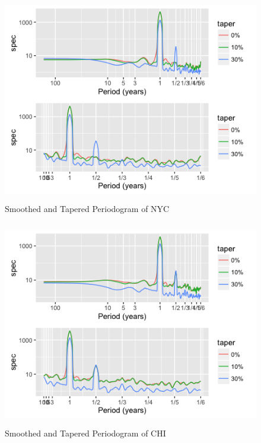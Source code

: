 \documentclass[12pt]{article}
\begin{document}
\begin{figure}[H]
    \includegraphics[width=\textwidth, height=9cm]{Figures/nycTaper.png}
    \caption{Smoothed and Tapered Periodogram of NYC}
\end{figure}

\begin{figure}[H]
    \includegraphics[width=\textwidth, height=9cm]{Figures/chiTaper.png}
    \caption{Smoothed and Tapered Periodogram of CHI}
\end{figure}
\end{document}
